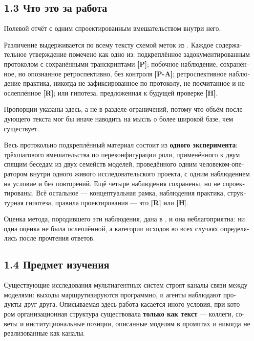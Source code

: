 \begin{russian}
\subsection*{1.3 Что это за работа}
\label{sec:ru:1.3}

Полевой отчёт с одним спроектированным вмешательством внутри него.

Различение выдерживается по всему тексту схемой меток из . Каждое содержательное утверждение помечено как одно из: подкреплённое задокументированным протоколом с сохранёнными транскриптами \textbf{[P]}; побочное наблюдение, сохранённое, но опознанное ретроспективно, без контроля \textbf{[P-A]}; ретроспективное наблюдение практика, никогда не зафиксированное по протоколу, не посчитанное и не ослеплённое \textbf{[R]}; или гипотеза, предложенная к будущей проверке \textbf{[H]}.

Пропорции указаны здесь, а не в разделе ограничений, потому что объём последующего текста мог бы иначе наводить на мысль о более широкой базе, чем существует.

Весь протокольно подкреплённый материал состоит из \textbf{одного эксперимента}: трёхшагового вмешательства по переконфигурации роли, применённого к двум спящим беседам из двух семейств моделей, проведённого одним человеком-оператором внутри одного живого исследовательского проекта, с одним наблюдением на условие и без повторений. Ещё четыре наблюдения сохранены, но не спроектированы. Всё остальное — концептуальная рамка, наблюдения практика, структурная гипотеза, правила проектирования — это \textbf{[R]} или \textbf{[H]}.

Оценка метода, породившего эти наблюдения, дана в , и она неблагоприятна: ни одна оценка не была ослеплённой, а категории исходов во всех случаях определялись после прочтения ответов.


\subsection*{1.4 Предмет изучения}
\label{sec:ru:1.4}

Существующие исследования мультиагентных систем строят каналы связи между моделями: выходы маршрутизируются программно, и агенты наблюдают продукты друг друга. Описываемая здесь работа касается иного условия, при котором организационная структура существовала \textbf{только как текст} — коллеги, советы и институциональные позиции, описанные моделям в промптах и никогда не реализованные как каналы.


\end{russian}
